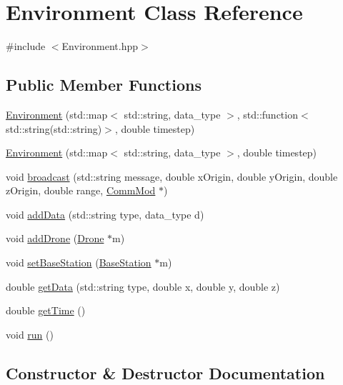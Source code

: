 \hypertarget{class_environment}{}\section{Environment Class Reference}
\label{class_environment}


{\ttfamily \#include $<$Environment.\+hpp$>$}

\subsection*{Public Member Functions}
\begin{DoxyCompactItemize}
\item 
\hyperlink{class_environment_aaddf445dbf4217a68a373e183a2bfb0c}{Environment} (std\+::map$<$ std\+::string, data\+\_\+type $>$, std\+::function$<$ std\+::string(std\+::string)$>$, double timestep)
\item 
\hyperlink{class_environment_a098fcd6da9a033833095ec76f60aab0d}{Environment} (std\+::map$<$ std\+::string, data\+\_\+type $>$, double timestep)
\item 
void \hyperlink{class_environment_a8d5bb36197739b8fb8532755210865c4}{broadcast} (std\+::string message, double x\+Origin, double y\+Origin, double z\+Origin, double range, \hyperlink{class_comm_mod}{Comm\+Mod} $\ast$)
\item 
void \hyperlink{class_environment_abadae98bdccb015d49c6f94c97a8bf82}{add\+Data} (std\+::string type, data\+\_\+type d)
\item 
void \hyperlink{class_environment_a95654e6bc17cbd781453fdb256fa979b}{add\+Drone} (\hyperlink{class_drone}{Drone} $\ast$m)
\item 
void \hyperlink{class_environment_aa06fdaa6619d957c10d858c176f3f307}{set\+Base\+Station} (\hyperlink{class_base_station}{Base\+Station} $\ast$m)
\item 
double \hyperlink{class_environment_a0a2b32ecbd52779d17b3d9a483aa6d24}{get\+Data} (std\+::string type, double x, double y, double z)
\item 
double \hyperlink{class_environment_a03d9d2db949b5491e60e922d9a33769b}{get\+Time} ()
\item 
void \hyperlink{class_environment_a41a43b88702fff5df95e98d10e49f541}{run} ()
\end{DoxyCompactItemize}


\subsection{Constructor \& Destructor Documentation}
